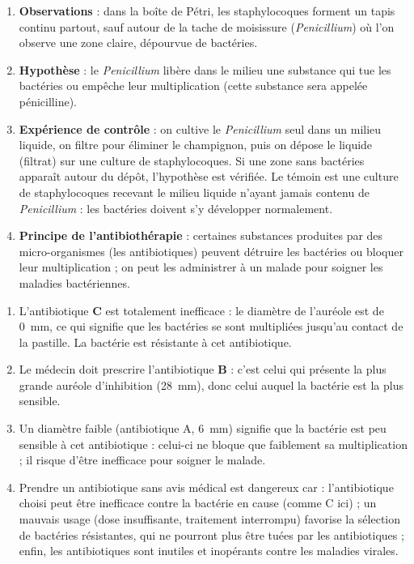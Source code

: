 \documentclass[11pt]{article}
\newcommand{\cle}[1]{{\popxbold\color{popdark}#1}}
\begin{document}
\begin{corrige}
\begin{enumerate}
\item \textbf{Observations} : dans la boîte de Pétri, les staphylocoques forment un tapis continu partout, sauf autour de la tache de moisissure (\emph{Penicillium}) où l'on observe une zone claire, dépourvue de bactéries.
\item \textbf{Hypothèse} : le \emph{Penicillium} libère dans le milieu une substance qui tue les bactéries ou empêche leur multiplication (cette substance sera appelée \cle{pénicilline}).
\item \textbf{Expérience de contrôle} : on cultive le \emph{Penicillium} seul dans un milieu liquide, on filtre pour éliminer le champignon, puis on dépose le liquide (filtrat) sur une culture de staphylocoques. Si une zone sans bactéries apparaît autour du dépôt, l'hypothèse est vérifiée. Le témoin est une culture de staphylocoques recevant le milieu liquide n'ayant jamais contenu de \emph{Penicillium} : les bactéries doivent s'y développer normalement.
\item \textbf{Principe de l'antibiothérapie} : certaines substances produites par des micro-organismes (les antibiotiques) peuvent détruire les bactéries ou bloquer leur multiplication ; on peut les administrer à un malade pour soigner les maladies bactériennes.
\end{enumerate}
\end{corrige}

\begin{corrige}
\begin{enumerate}
\item L'antibiotique \textbf{C} est totalement inefficace : le diamètre de l'auréole est de \SI{0}{mm}, ce qui signifie que les bactéries se sont multipliées jusqu'au contact de la pastille. La bactérie est \cle{résistante} à cet antibiotique.
\item Le médecin doit prescrire l'antibiotique \textbf{B} : c'est celui qui présente la plus grande auréole d'inhibition (\SI{28}{mm}), donc celui auquel la bactérie est la plus sensible.
\item Un diamètre faible (antibiotique A, \SI{6}{mm}) signifie que la bactérie est peu sensible à cet antibiotique : celui-ci ne bloque que faiblement sa multiplication ; il risque d'être inefficace pour soigner le malade.
\item Prendre un antibiotique sans avis médical est dangereux car : l'antibiotique choisi peut être inefficace contre la bactérie en cause (comme C ici) ; un mauvais usage (dose insuffisante, traitement interrompu) favorise la sélection de \cle{bactéries résistantes}, qui ne pourront plus être tuées par les antibiotiques ; enfin, les antibiotiques sont inutiles et inopérants contre les maladies virales.
\end{enumerate}
\end{corrige}
\end{document}
